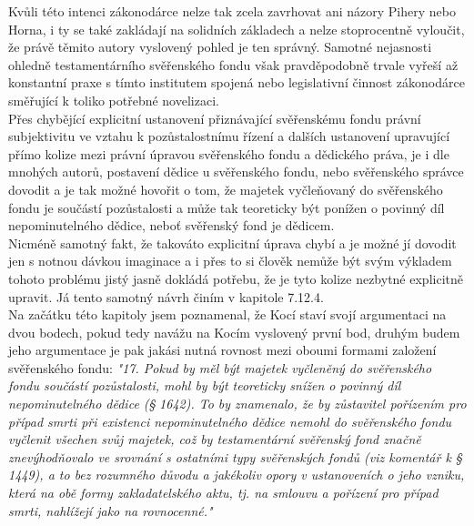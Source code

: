 \documentclass{article}
\begin{document}
 Kvůli této intenci zákonodárce nelze tak zcela zavrhovat ani názory Pihery nebo Horna, i ty se také zakládají na solidních základech a nelze stoprocentně vyloučit, že právě těmito autory vyslovený pohled je ten správný. Samotné nejasnosti ohledně testamentárního svěřenského fondu však pravděpodobně trvale vyřeší až konstantní praxe s tímto institutem spojená nebo legislativní činnost zákonodárce směřující k toliko potřebné novelizaci.\\
 
 Přes chybějící explicitní ustanovení přiznávající svěřenskému fondu právní subjektivitu ve vztahu k pozůstalostnímu řízení a dalších ustanovení upravující přímo kolize mezi právní úpravou svěřenského fondu a dědického práva, je i dle mnohých autorů, postavení dědice u svěřenského fondu, nebo svěřenského správce dovodit a je tak možné hovořit o tom, že majetek vyčleňovaný do svěřenského fondu je součástí pozůstalosti a může tak teoreticky být ponížen o povinný díl nepominutelného dědice, neboť svěřenský fond je dědicem.\\
 
 Nicméně samotný fakt, že takováto explicitní úprava chybí a je možné jí dovodit jen s notnou dávkou imaginace a i přes to si člověk nemůže být svým výkladem tohoto problému jistý jasně dokládá potřebu, že je tyto kolize nezbytné explicitně upravit. Já tento samotný návrh činím v kapitole 7.12.4.\\
 
 Na začátku této kapitoly jsem poznamenal, že Kocí staví svojí argumentaci na dvou bodech, pokud tedy navážu na Kocím vyslovený první bod, druhým budem jeho argumentace je pak jakási nutná rovnost mezi oboumi formami založení svěřenského fondu: \textit{"17. Pokud by měl být majetek vyčleněný do svěřenského fondu součástí pozů­stalosti, mohl by být teoreticky snížen o povinný díl nepominutelného dědice (§ 1642). To by znamenalo, že by zůstavitel pořízením pro případ smrti při existenci nepominutelného dědice nemohl do svěřenského fondu vyčlenit všechen svůj majetek, což by testamentární svěřenský fond značně znevýhodňovalo ve srovnání s ostatními typy svěřenských fondů (viz komentář k § 1449), a to bez rozumného důvodu a jakékoliv opory v ustanoveních o jeho vzniku, která na obě formy zakladatelského aktu, tj. na smlouvu a pořízení pro případ smrti, nahlížejí jako na rovnocenné."}\\
 
\end{document}
